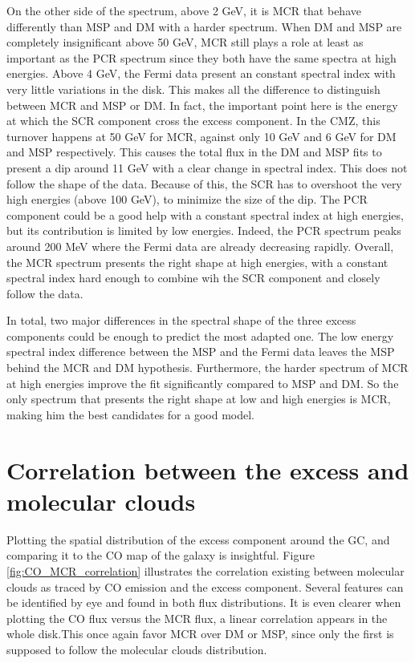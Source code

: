 On the other side of the spectrum, above 2 GeV, it is MCR that behave differently than MSP and DM with a harder spectrum. When DM and MSP are completely insignificant above 50 GeV, MCR still plays a role at least as important as the PCR spectrum since they both have the same spectra at high energies. Above 4 GeV, the Fermi data present an constant spectral index with very little variations in the disk. This makes all the difference to distinguish between MCR and MSP or DM. In fact, the important point here is the energy at which the SCR component cross the excess component. In the CMZ, this turnover happens at 50 GeV for MCR, against only 10 GeV and 6 GeV for DM and MSP respectively. This causes the total flux in the DM and MSP fits to present a dip around 11 GeV with a clear change in spectral index. This does not follow the shape of the data. Because of this, the SCR has to overshoot the very high energies (above 100 GeV), to minimize the size of the dip. The PCR component could be a good help with a constant spectral index at high energies, but its contribution is limited by low energies. Indeed, the PCR spectrum peaks around 200 MeV where the Fermi data are already decreasing rapidly. Overall, the MCR spectrum presents the right shape at high energies, with a constant spectral index hard enough to combine wih the SCR component and closely follow the data.


In total, two major differences in the spectral shape of the three excess components could be enough to predict the most adapted one. The low energy spectral index difference between the MSP and the Fermi data leaves the MSP behind the MCR and DM hypothesis. Furthermore, the harder spectrum of MCR at high energies improve the fit significantly compared to MSP and DM. So the only spectrum that presents the right shape at low and high energies is MCR, making him the best candidates for a good model.

\newpage
\section{Correlation between the excess and molecular clouds}

Plotting the spatial distribution of the excess component around the GC, and comparing it to the CO map of the galaxy is insightful. Figure \ref{fig:CO_MCR_correlation} illustrates the correlation existing between molecular clouds as traced by CO emission and the excess component. Several features can be identified by eye and found in both flux distributions. It is even clearer when plotting the CO flux versus the MCR flux, a linear correlation appears in the whole disk.This once again favor MCR over DM or MSP, since only the first is supposed to follow the molecular clouds distribution.

